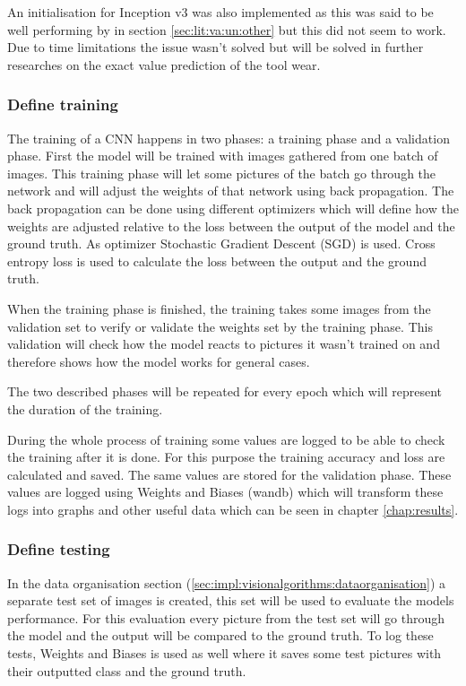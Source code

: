 			An initialisation for Inception v3 was also implemented as this was said to be well performing by \cite{Xu2019} in section \ref{sec:lit:va:un:other} but this did not seem to work. Due to time limitations the issue wasn't solved but will be solved in further researches on the exact value prediction of the tool wear.
			
		\subsubsection{Define training}
			The training of a CNN happens in two phases: a training phase and a validation phase. First the model will be trained with images gathered from one batch of images. This training phase will let some pictures of the batch go through the network and will adjust the weights of that network using back propagation. The back propagation can be done using different optimizers which will define how the weights are adjusted relative to the loss between the output of the model and the ground truth. As optimizer Stochastic Gradient Descent (SGD) is used. Cross entropy loss is used to calculate the loss between the output and the ground truth.
			
			When the training phase is finished, the training takes some images from the validation set to verify or validate the weights set by the training phase. This validation will check how the model reacts to pictures it wasn't trained on and therefore shows how the model works for general cases.
			
			The two described phases will be repeated for every epoch which will represent the duration of the training.
			
			During the whole process of training some values are logged to be able to check the training after it is done. For this purpose the training accuracy and loss are calculated and saved. The same values are stored for the validation phase. These values are logged using Weights and Biases (wandb) \citep{wandb} which will transform these logs into graphs and other useful data which can be seen in chapter \ref{chap:results}.
			
		\subsubsection{Define testing}
			In the data organisation section (\ref{sec:impl:visionalgorithms:dataorganisation}) a separate test set of images is created, this set will be used to evaluate the models performance. For this evaluation every picture from the test set will go through the model and the output will be compared to the ground truth. To log these tests, Weights and Biases is used as well where it saves some test pictures with their outputted class and the ground truth.
			
